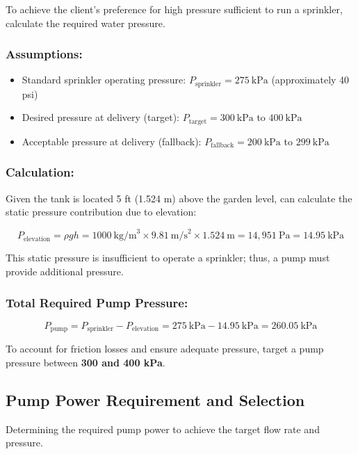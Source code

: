 \documentclass[12pt]{report}
\begin{document}
To achieve the client's preference for high pressure sufficient to run a sprinkler, calculate the required water pressure.

\subsubsection{Assumptions:}

\begin{itemize}
\item Standard sprinkler operating pressure: \( P_{\text{sprinkler}} = 275\ \text{kPa} \) (approximately 40 psi)
\item Desired pressure at delivery (target): \( P_{\text{target}} = 300\ \text{kPa} \) to \( 400\ \text{kPa} \)
\item Acceptable pressure at delivery (fallback): \( P_{\text{fallback}} = 200\ \text{kPa} \) to \( 299\ \text{kPa} \)
\end{itemize}

\subsubsection{Calculation:}

Given the tank is located 5 ft (1.524 m) above the garden level, can calculate the static pressure contribution due to elevation:

\[
P_{\text{elevation}} = \rho g h = 1000\ \text{kg/m}^3 \times 9.81\ \text{m/s}^2 \times 1.524\ \text{m} = 14,951\ \text{Pa} = 14.95\ \text{kPa}
\]

This static pressure is insufficient to operate a sprinkler; thus, a pump must provide additional pressure.

\subsubsection{Total Required Pump Pressure:}

\[
P_{\text{pump}} = P_{\text{sprinkler}} - P_{\text{elevation}} = 275\ \text{kPa} - 14.95\ \text{kPa} = 260.05\ \text{kPa}
\]

To account for friction losses and ensure adequate pressure, target a pump pressure between \textbf{300 and 400 kPa}.

\subsection{Pump Power Requirement and Selection}

Determining the required pump power to achieve the target flow rate and pressure.
\end{document}

